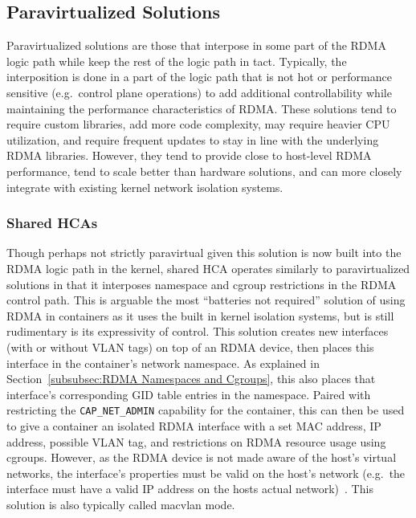 \documentclass[12pt,titlepage]{article}
\begin{document}
\subsection{Paravirtualized Solutions}
Paravirtualized solutions are those that interpose in some part of the RDMA logic path while keep the rest of the logic path in tact.
Typically, the interposition is done in a part of the logic path that is not hot or performance sensitive (e.g.\ control plane operations) to add additional controllability while maintaining the performance characteristics of RDMA\@.
These solutions tend to require custom libraries, add more code complexity, may require heavier CPU utilization, and require frequent updates to stay in line with the underlying RDMA libraries.
However, they tend to provide close to host-level RDMA performance, tend to scale better than hardware solutions, and can more closely integrate with existing kernel network isolation systems.

%

\subsubsection{Shared HCAs}
Though perhaps not strictly paravirtual given this solution is now built into the RDMA logic path in the kernel, shared HCA operates similarly to paravirtualized solutions in that it interposes namespace and cgroup restrictions in the RDMA control path.
This is arguable the most ``batteries not required'' solution of using RDMA in containers as it uses the built in kernel isolation systems, but is still rudimentary is its expressivity of control.
This solution creates new interfaces (with or without VLAN tags) on top of an RDMA device, then places this interface in the container's network namespace.
As explained in Section~\ref{subsubsec:RDMA Namespaces and Cgroups}, this also places that interface's corresponding GID table entries in the namespace.
Paired with restricting the \texttt{CAP\_NET\_ADMIN} capability for the container, this can then be used to give a container an isolated RDMA interface with a set MAC address, IP address, possible VLAN tag, and restrictions on RDMA resource usage using cgroups.
However, as the RDMA device is not made aware of the host's virtual networks, the interface's properties must be valid on the host's network (e.g.\ the interface must have a valid IP address on the hosts actual network)~\cite{mellanoxdockermacvlan,dockermacvlan}.
This solution is also typically called macvlan mode.
\end{document}
